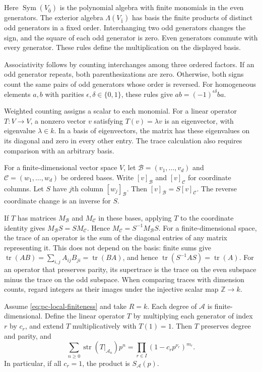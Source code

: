 Here $\operatorname{Sym}(V_{\bar0})$ is the polynomial algebra with finite
monomials in the even generators. The exterior algebra
$\Lambda(V_{\bar1})$ has basis the finite products of distinct odd
generators in a fixed order.
Interchanging two odd generators changes the sign, and the square of each
odd generator is zero. Even generators commute with every generator.
These rules define the multiplication on the displayed basis.

Associativity follows by counting interchanges among three ordered factors.
If an odd generator repeats, both parenthesizations are zero. Otherwise,
both signs count the same pairs of odd generators whose order is reversed.
For homogeneous elements $a,b$ with parities $\epsilon,\delta\in\{0,1\}$,
these rules give $ab=(-1)^{\epsilon\delta}ba$.

Weighted counting assigns a scalar to each monomial.
For a linear operator $T:V\to V$, a nonzero vector $v$ satisfying
$T(v)=\lambda v$ is an eigenvector, with eigenvalue $\lambda\in k$.
In a basis of eigenvectors, the matrix has these eigenvalues on its
diagonal and zero in every other entry.
The trace calculation also requires comparison with an arbitrary basis.

For a finite-dimensional vector space $V$, let
$\mathcal B=(v_1,\ldots,v_d)$ and $\mathcal C=(w_1,\ldots,w_d)$ be ordered
bases. Write $[v]_{\mathcal B}$ and $[v]_{\mathcal C}$ for coordinate
columns. Let $S$ have $j$th column $[w_j]_{\mathcal B}$.
Then $[v]_{\mathcal B}=S[v]_{\mathcal C}$.
The reverse coordinate change is an inverse for $S$.

If $T$ has matrices $M_{\mathcal B}$ and $M_{\mathcal C}$ in these bases,
applying $T$ to the coordinate identity gives
$M_{\mathcal B}S=SM_{\mathcal C}$.
Hence $M_{\mathcal C}=S^{-1}M_{\mathcal B}S$.
For a finite-dimensional space, the trace of an operator is the sum of
the diagonal entries of any matrix representing it.
This does not depend on the basis: finite sums give
$\operatorname{tr}(AB)=\sum_{i,j}A_{ij}B_{ji}=\operatorname{tr}(BA)$,
and hence $\operatorname{tr}(S^{-1}AS)=\operatorname{tr}(A)$.
For an operator that preserves parity, its supertrace is the trace on the
even subspace minus the trace on the odd subspace.
When comparing traces with dimension counts, regard integers as their
images under the injective scalar map $\mathbb Z\to k$.

\begin{proposition}
\label{prop:pc-realization}
Assume \eqref{eq:pc-local-finiteness} and take $R=k$.
Each degree of $\mathcal A$ is finite-dimensional.
Define the linear operator $T$ by multiplying each generator of index $r$
by $c_r$, and extend $T$ multiplicatively with $T(1)=1$.
Then $T$ preserves degree and parity, and
\[
 \sum_{n\geq0}\operatorname{str}(T|_{\mathcal A_n})p^n
   =\prod_{r\in I}(1-c_rp^{\nu_r})^{m_r}.
\]
In particular, if all $c_r=1$, the product is $S_{\mathcal A}(p)$.
\end{proposition}

